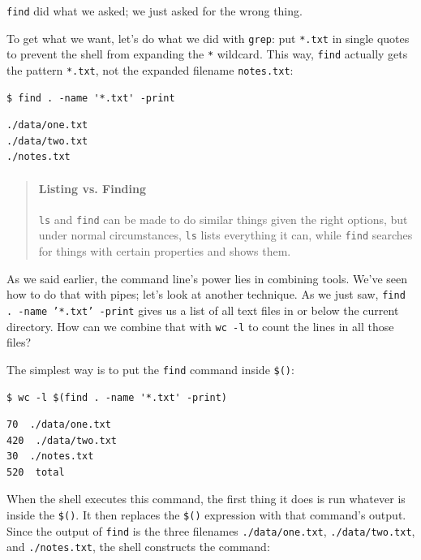 \documentclass[]{book}
\begin{document}
\texttt{find} did what we asked; we just asked for the wrong thing.

To get what we want, let's do what we did with \texttt{grep}: put
\texttt{*.txt} in single quotes to prevent the shell from expanding the
\texttt{*} wildcard. This way, \texttt{find} actually gets the pattern
\texttt{*.txt}, not the expanded filename \texttt{notes.txt}:

\begin{verbatim}
$ find . -name '*.txt' -print
\end{verbatim}

\begin{verbatim}
./data/one.txt
./data/two.txt
./notes.txt
\end{verbatim}

\begin{quote}
\mbox{}\paragraph{Listing vs. Finding}

\texttt{ls} and \texttt{find} can be made to do similar things given the
right options, but under normal circumstances, \texttt{ls} lists
everything it can, while \texttt{find} searches for things with certain
properties and shows them.
\end{quote}

As we said earlier, the command line's power lies in combining tools.
We've seen how to do that with pipes; let's look at another technique.
As we just saw, \texttt{find . -name '*.txt' -print} gives us a list of
all text files in or below the current directory. How can we combine
that with \texttt{wc -l} to count the lines in all those files?

The simplest way is to put the \texttt{find} command inside
\texttt{\$()}:

\begin{verbatim}
$ wc -l $(find . -name '*.txt' -print)
\end{verbatim}

\begin{verbatim}
70  ./data/one.txt
420  ./data/two.txt
30  ./notes.txt
520  total
\end{verbatim}

When the shell executes this command, the first thing it does is run
whatever is inside the \texttt{\$()}. It then replaces the \texttt{\$()}
expression with that command's output. Since the output of \texttt{find}
is the three filenames \texttt{./data/one.txt}, \texttt{./data/two.txt},
and \texttt{./notes.txt}, the shell constructs the command:
\end{document}
